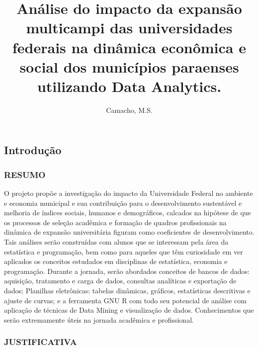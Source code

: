 \documentclass[]{article}
\title{Análise do impacto da expansão multicampi das universidades federais na
dinâmica econômica e social dos municípios paraenses utilizando Data
Analytics.}
\author{Camacho, M.S.}
\date{}
\begin{document}
\maketitle

\hypertarget{introducao}{%
\subsection{Introdução}\label{introducao}}

\hypertarget{resumo}{%
\subsubsection{RESUMO}\label{resumo}}

O projeto propõe a investigação do impacto da Universidade Federal no
ambiente e economia municipal e sua contribuição para o desenvolvimento
sustentável e melhoria de índices sociais, humanos e demográficos,
calcados na hipótese de que os processos de seleção acadêmica e formação
de quadros profissionais na dinâmica de expansão universitária figuram
como coeficientes de desenvolvimento. Tais análises serão construídas
com alunos que se interessam pela área da estatística e programação, bem
como para aqueles que têm curiosidade em ver aplicados os conceitos
estudados em disciplinas de estatística, economia e programação. Durante
a jornada, serão abordados conceitos de bancos de dados: aquisição,
tratamento e carga de dados, consultas analíticas e exportação de dados;
Planilhas eletrônicas: tabelas dinâmicas, gráficos, estatísticas
descritivas e ajuste de curvas; e a ferramenta GNU R com todo seu
potencial de análise com aplicação de técnicas de Data Mining e
visualização de dados. Conhecimentos que serão extremamente úteis na
jornada acadêmica e profissional.

\hypertarget{justificativa}{%
\subsubsection{JUSTIFICATIVA}\label{justificativa}}
\end{document}
